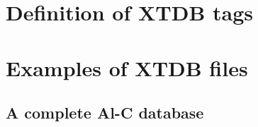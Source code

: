 \documentclass[preprint,review,12pt]{elsarticle}
\begin{document}
\newpage

\begin{appendix}

\setcounter{equation}{0}
\renewcommand{\theequation}{C\arabic{equation}}
\setcounter{figure}{0}
\renewcommand{\thefigure}{C\arabic{figure}}

\section{Definition of XTDB tags}


\setcounter{equation}{0}
\renewcommand{\theequation}{B\arabic{equation}}
\setcounter{figure}{0}
\renewcommand{\thefigure}{B\arabic{figure}}

\section{Examples of XTDB files}\label{sc:examples}

\subsection{A complete Al-C database}\label{sc:alcexample}


\end{appendix}
\end{document}
